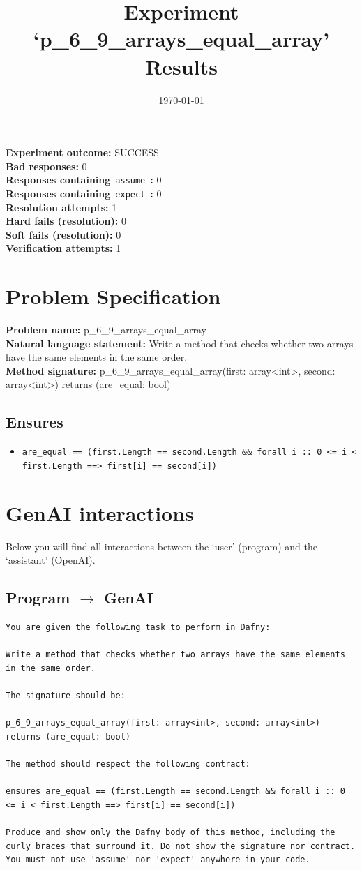 \documentclass{article}
\begin{document}
\title{Experiment `p\_6\_9\_arrays\_equal\_array' Results}
\author{\today}
\date{}
\maketitle
\textbf{Experiment outcome: }SUCCESS
\\\textbf{Bad responses: }0
\\\textbf{Responses containing}~\texttt{assume}~\textbf{: }0
\\\textbf{Responses containing}~\texttt{expect}~\textbf{: }0
\\\textbf{Resolution attempts: }1
\\\textbf{Hard fails (resolution): }0
\\\textbf{Soft fails (resolution): }0
\\\textbf{Verification attempts: }1
\section*{Problem Specification}
\textbf{Problem name: }p\_6\_9\_arrays\_equal\_array
\\\textbf{Natural language statement: }Write a method that checks whether two arrays have the same elements in the same order.
\\\textbf{Method signature: }p\_6\_9\_arrays\_equal\_array(first: array<int>, second: array<int>) returns (are\_equal: bool)
\subsection*{Ensures}
\begin{itemize}
\item \texttt{are\_equal == (first.Length == second.Length \&\& forall i :: 0 <= i < first.Length ==> first[i] == second[i])}
\end{itemize}
\clearpage
\section*{GenAI interactions}
Below you will find all interactions between the `user' (program) and the `assistant' (OpenAI).
\subsection*{Program $\rightarrow$ GenAI}
\begin{lstlisting}
You are given the following task to perform in Dafny:

Write a method that checks whether two arrays have the same elements in the same order.

The signature should be:

p_6_9_arrays_equal_array(first: array<int>, second: array<int>) returns (are_equal: bool)

The method should respect the following contract:

ensures are_equal == (first.Length == second.Length && forall i :: 0 <= i < first.Length ==> first[i] == second[i])

Produce and show only the Dafny body of this method, including the curly braces that surround it. Do not show the signature nor contract. You must not use 'assume' nor 'expect' anywhere in your code.
\end{lstlisting}
\end{document}
